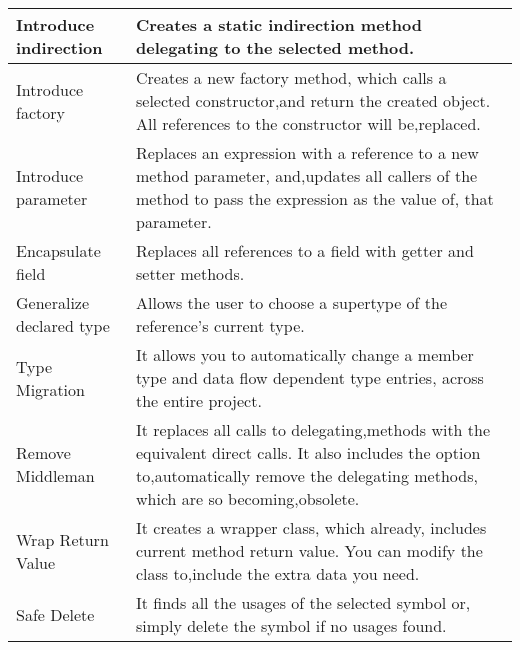 \begin{table}[h]
\begin{tabular}{p{3cm} p{11 cm}}
Introduce indirection               & Creates a static indirection method delegating to the selected method.                                                                                                                                    \\ \hline
Introduce factory                   & Creates a new factory method, which calls a selected constructor,and return the created object. All references to the constructor will be,replaced.                                                       \\ \hline
Introduce parameter                 & Replaces an expression with a reference to a new method parameter, and,updates all callers of the method to pass the expression as the value of, that parameter.                                          \\ \hline
Encapsulate field                   & Replaces all references to a field with getter and setter methods.                                                                                                                                        \\ \hline
Generalize declared type            & Allows the user to choose a supertype of the reference's current type.                                                                                                                                    \\ \hline
Type Migration                      & It allows you to automatically change a member type and data flow dependent type entries, across the entire project.                                                                                      \\ \hline
Remove Middleman                    & It replaces all calls to delegating,methods with the equivalent direct calls. It also includes the option to,automatically remove the delegating methods, which are so becoming,obsolete.                 \\ \hline
Wrap Return Value                   & It creates a wrapper class, which already, includes current method return value. You can modify the class to,include the extra data you need.                                                             \\ \hline
Safe Delete                         & It finds all the usages of the selected symbol or, simply delete the symbol if no usages found.                                                                                                           \\ \hline

\end{tabular}
\end{table}
